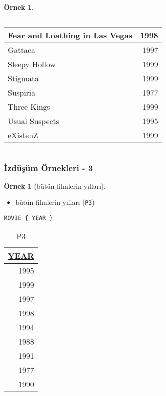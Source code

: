 \documentclass[dvipsnames]{beamer}
\theoremstyle{definition}
\theoremstyle{example}
\newtheorem{ornek}[theorem]{Örnek}
\theoremstyle{plain}
\begin{document}
\begin{frame}[fragile]
\begin{ornek}
\begin{columns}[b]
      \begin{tiny}
      \begin{table}
        \begin{tabular}{|l|r|}\hline
Fear and Loathing in Las Vegas & 1998\\\hline
Gattaca                        & 1997\\\hline
Sleepy Hollow                  & 1999\\\hline
Stigmata                       & 1999\\\hline
Suspiria                       & 1977\\\hline
Three Kings                    & 1999\\\hline
Usual Suspects                 & 1995\\\hline
eXistenZ                       & 1999\\\hline
        \end{tabular}
      \end{table}
      \end{tiny}
    \end{columns}
  \end{ornek}
\end{frame}

\begin{frame}[fragile]
  \frametitle{İzdüşüm Örnekleri - 3}

  \begin{ornek}[bütün filmlerin yılları]
    \begin{itemize}
      \item bütün filmlerin yılları (\texttt{P3})
    \end{itemize}

    \begin{lstlisting}
MOVIE { YEAR }
    \end{lstlisting}

    \pause
    \vspace{-10pt}
    \begin{tiny}
    \begin{table}
      \caption{P3}
      \begin{tabular}{|r|}\hline
\underline{YEAR}\\[2pt]\hline\hline
            1995\\\hline
            1999\\\hline
            1997\\\hline
            1998\\\hline
            1994\\\hline
            1988\\\hline
            1991\\\hline
            1977\\\hline
            1990\\\hline
      \end{tabular}
    \end{table}
    \end{tiny}
  \end{ornek}
\end{frame}
\end{document}

